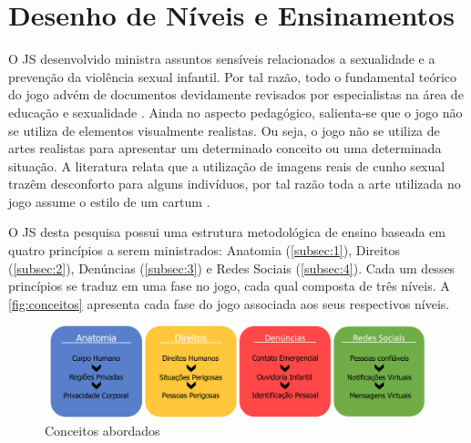 \newpage

\section{Desenho de Níveis e Ensinamentos}\label{sec:DN}

O \acf{JS} desenvolvido ministra assuntos sensíveis relacionados a sexualidade e a prevenção da violência sexual infantil. Por tal razão, todo o fundamental teórico do jogo advém de documentos devidamente revisados por especialistas na área de educação e sexualidade \cite{unesco2018international}. Ainda no aspecto pedagógico, salienta-se que o jogo não se utiliza de elementos visualmente realistas. Ou seja, o jogo não se utiliza de artes realistas para apresentar um determinado conceito ou uma determinada situação. A literatura relata que a utilização de imagens reais de cunho sexual trazêm desconforto para alguns indivíduos, por tal razão toda a arte utilizada no jogo assume o estilo de um cartum \cite{albert2020desenvolvimento}.

O \ac{JS} desta pesquisa possui uma estrutura metodológica de ensino baseada em quatro princípios a serem ministrados: Anatomia (\autoref{subsec:1}), Direitos (\autoref{subsec:2}), Denúncias (\autoref{subsec:3}) e Redes Sociais (\autoref{subsec:4}). Cada um desses princípios se traduz em uma fase no jogo, cada qual composta de três níveis. A \autoref{fig:conceitos} apresenta cada fase do jogo associada aos seus respectivos níveis.

\begin{figure}[hbt!]
  \caption{\label{fig:conceitos}Conceitos abordados}\vspace{-0.3cm}
  \begin{center}
    \includegraphics[width=\linewidth]{./Visuais/EsquemaFases2.pdf}
    \end{center}\vspace{-0.3cm}
\end{figure}

\vspace{-0.4cm}


